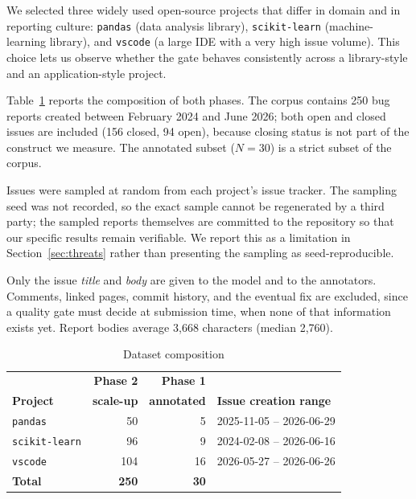 We selected three widely used open-source projects that differ in
domain and in reporting culture: \texttt{pandas} (data analysis
library), \texttt{scikit-learn} (machine-learning library), and
\texttt{vscode} (a large IDE with a very high issue volume). This
choice lets us observe whether the gate behaves consistently across a
library-style and an application-style project.

Table~\ref{tab:dataset} reports the composition of both phases. The
corpus contains 250 bug reports created between February 2024 and June
2026; both open and closed issues are included (156 closed, 94 open),
because closing status is not part of the construct we measure. The
annotated subset ($N=30$) is a strict subset of the corpus.

Issues were sampled at random from each project's issue tracker.
The sampling seed was not recorded, so the exact sample cannot be
regenerated by a third party; the sampled reports themselves are
committed to the repository so that our specific results remain
verifiable. We report this as a limitation in
Section~\ref{sec:threats} rather than presenting the sampling as
seed-reproducible.

Only the issue \emph{title} and \emph{body} are given to the model and
to the annotators. Comments, linked pages, commit history, and the
eventual fix are excluded, since a quality gate must decide at
submission time, when none of that information exists yet. Report
bodies average 3{,}668 characters (median 2{,}760).

\begin{table}[t]
\caption{Dataset composition}
\label{tab:dataset}
\centering
\begin{tabular}{lrrl}
\hline
 & \textbf{Phase 2} & \textbf{Phase 1} & \\
\textbf{Project} & \textbf{scale-up} & \textbf{annotated} & \textbf{Issue creation range} \\
\hline
\texttt{pandas}       &  50 &  5 & 2025-11-05 -- 2026-06-29 \\
\texttt{scikit-learn} &  96 &  9 & 2024-02-08 -- 2026-06-16 \\
\texttt{vscode}       & 104 & 16 & 2026-05-27 -- 2026-06-26 \\
\hline
\textbf{Total}        & \textbf{250} & \textbf{30} & \\
\hline
\end{tabular}
\end{table}


